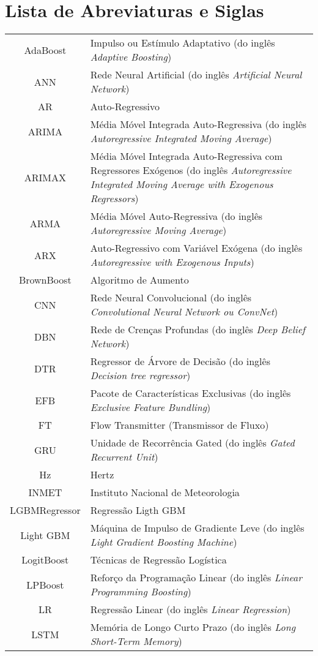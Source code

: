 \newpage
{}
\section*{Lista de Abreviaturas e Siglas}



\begin{tabular}{cp{}}
	AdaBoost & Impulso ou Estímulo Adaptativo (do inglês \textit{Adaptive Boosting}) \\
	ANN & Rede Neural Artificial (do inglês \textit{Artificial Neural Network}) \\
	AR & Auto-Regressivo\\
	ARIMA & Média Móvel Integrada Auto-Regressiva (do inglês \textit{Autoregressive Integrated Moving Average}) \\
	ARIMAX & Média Móvel Integrada Auto-Regressiva com Regressores Exógenos (do inglês \textit{Autoregressive Integrated Moving Average with Exogenous Regressors})\\
	ARMA & Média Móvel Auto-Regressiva (do inglês \textit{Autoregressive Moving Average}) \\
	ARX & Auto-Regressivo com Variável Exógena (do inglês \textit{Autoregressive with Exogenous Inputs})\\
	BrownBoost & Algoritmo de Aumento\\
	CNN & Rede Neural Convolucional (do inglês \textit{Convolutional Neural Network ou ConvNet})\\
	DBN & Rede de Crenças Profundas (do inglês \textit{Deep Belief Network}) \\
	DTR & Regressor de Árvore de Decisão (do inglês \textit{Decision tree regressor}) \\
	EFB & Pacote de Características Exclusivas (do inglês \textit{Exclusive Feature Bundling})\\
	FT & Flow Transmitter (Transmissor de Fluxo)\\
	GRU & Unidade de Recorrência Gated (do inglês \textit{Gated Recurrent Unit}) \\
	Hz & Hertz\\
	INMET & Instituto Nacional de Meteorologia\\
	LGBMRegressor & Regressão Ligth GBM\\
	Light GBM & Máquina de Impulso de Gradiente Leve (do inglês \textit{Light Gradient Boosting Machine}) \\
	LogitBoost & Técnicas de Regressão Logística\\
	LPBoost & Reforço da Programação Linear (do inglês \textit{Linear Programming Boosting}) \\
	LR & Regressão Linear (do inglês \textit{Linear Regression})\\
	LSTM & Memória de Longo Curto Prazo (do inglês \textit{Long Short-Term Memory})		
\end{tabular}

